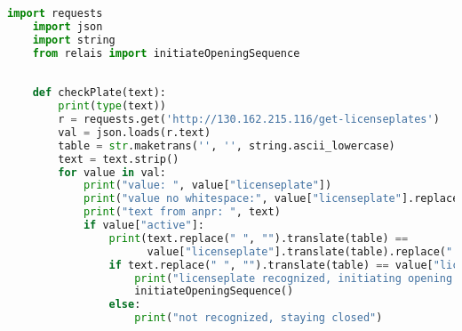 \begin{lstlisting}[language=Python,caption=checkLicensePlate code,label=lst:impl:checkLicensePLate]
    import requests
    import json
    import string
    from relais import initiateOpeningSequence
    
    
    def checkPlate(text):
        print(type(text))
        r = requests.get('http://130.162.215.116/get-licenseplates')
        val = json.loads(r.text)
        table = str.maketrans('', '', string.ascii_lowercase)
        text = text.strip()
        for value in val:
            print("value: ", value["licenseplate"])
            print("value no whitespace:", value["licenseplate"].replace(" ", ""))
            print("text from anpr: ", text)
            if value["active"]:
                print(text.replace(" ", "").translate(table) ==
                      value["licenseplate"].translate(table).replace(" ", ""))
                if text.replace(" ", "").translate(table) == value["licenseplate"].translate(table).replace(" ", ""):
                    print("licenseplate recognized, initiating opening sequence")
                    initiateOpeningSequence()
                else:
                    print("not recognized, staying closed")
    
    \end{lstlisting}

